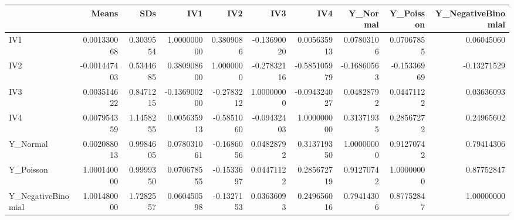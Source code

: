 \begin{longtable}{l|rrrrrrrrr}
\toprule
\multicolumn{1}{l}{} & Means & SDs & IV1 & IV2 & IV3 & IV4 & Y\_Normal & Y\_Poisson & Y\_NegativeBinomial \\ 
\midrule
IV1 & 0.001330068 & 0.3039554 & 1.000000000 & 0.3809086 & -0.13690020 & 0.005635913 & 0.07803106 & 0.07067855 & 0.06045060 \\ 
IV2 & -0.001447403 & 0.5344685 & 0.380908600 & 1.0000000 & -0.27832116 & -0.585105979 & -0.16860563 & -0.15336969 & -0.13271529 \\ 
IV3 & 0.003514622 & 0.8471215 & -0.136900200 & -0.2783212 & 1.00000000 & -0.094324027 & 0.04828792 & 0.04471122 & 0.03636093 \\ 
IV4 & 0.007954359 & 1.1458255 & 0.005635913 & -0.5851060 & -0.09432403 & 1.000000000 & 0.31371935 & 0.28567272 & 0.24965602 \\ 
Y\_Normal & 0.002088013 & 0.9984605 & 0.078031061 & -0.1686056 & 0.04828792 & 0.313719350 & 1.00000000 & 0.91270742 & 0.79414306 \\ 
Y\_Poisson & 1.000140000 & 0.9999350 & 0.070678555 & -0.1533697 & 0.04471122 & 0.285672719 & 0.91270742 & 1.00000000 & 0.87752847 \\ 
Y\_NegativeBinomial & 1.001480000 & 1.7282557 & 0.060450598 & -0.1327153 & 0.03636093 & 0.249656016 & 0.79414306 & 0.87752847 & 1.00000000 \\ 
\bottomrule
\end{longtable}

